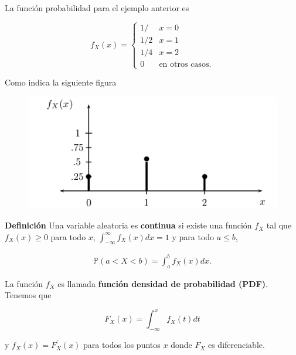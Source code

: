 \documentclass{article}\usepackage[]{graphicx}\usepackage[]{color}
\begin{document}
\vspace{0.3cm}

La funci\'on probabilidad para el ejemplo  anterior es

\vspace{0.3cm}

\[
f_{X}(x) = \begin{cases}
1/ & x = 0\\
1/2 & x = 1\\
1/4 & x = 2\\
0 & \mbox{en otros casos}.
\end{cases}
\]

\vspace{0.2cm}

Como indica la siguiente figura

\vspace{0.2cm}

\vspace{0.2cm}
\begin{figure}[h]
\centering
\includegraphics[scale=.55]{graff1-jk.png}
\end{figure}

\vspace{0.5cm}

\textbf{Definici\'on} Una variable aleatoria es \textbf{continua} si existe una funci\'on $f_X$ tal que $f_X(x) \geq 0$ para todo $x$, $\int_{-\infty}^{\infty}f_X(x)dx = 1$ y para todo $a \leq b$,

\begin{align}
\mathbb{P}(a < X < b) = \int_a^{b}f_{X}(x)dx.
\end{align}

La funci\'on $f_X$ es llamada \textbf{funci\'on densidad de probabilidad (PDF)}. Tenemos que

\[
F_{X}(x) = \int_{-\infty}^{x}f_{X}(t)dt
\]

y $f_{X}(x) = F_{X}^{'}(x)$ para todos los puntos $x$ donde $F_X$ es diferenciable.
\end{document}
